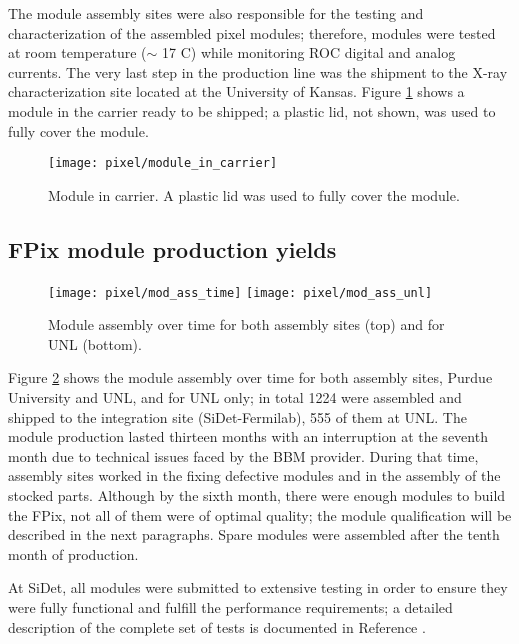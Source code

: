 The module assembly sites were also responsible for the testing and characterization of the assembled pixel modules; therefore, modules were tested at room temperature ($\sim$ 17 C) while monitoring ROC digital and analog currents. The very last step in the production line was the shipment to the X-ray characterization site located at the University of Kansas. Figure \ref{fig:module_in_carrier} shows a module in the carrier ready to be shipped; a plastic lid, not shown, was used to fully cover the module.       

\begin{figure}[h]
\centering
  \texttt{[image: pixel/module\_in\_carrier]}
 \caption[Module in carrier.]{Module in carrier. A plastic lid was used to fully cover the module.}\label{fig:module_in_carrier}
\end{figure}

\subsection{FPix module production yields}

\begin{figure}[ht]
\centering
  \texttt{[image: pixel/mod\_ass\_time]}
  \texttt{[image: pixel/mod\_ass\_unl]}
 \caption[Module assembly over time.]{Module assembly over time for both assembly sites (top) and for UNL (bottom).}\label{fig:mod_ass_time}
\end{figure}

Figure \ref{fig:mod_ass_time} shows the module assembly over time for both assembly sites, Purdue University and UNL, and for UNL only; in total 1224 were assembled and shipped to the integration site (SiDet-Fermilab), 555 of them at UNL. The module production lasted thirteen months with an interruption at the seventh month due to technical issues faced by the BBM provider. During that time, assembly sites worked in the fixing defective modules and in the assembly of the stocked parts. Although by the sixth month, there were enough modules to build the FPix, not all of them were of optimal quality; the module qualification will be described in the next paragraphs. Spare modules were assembled after the tenth month of production.     

At SiDet, all modules were submitted to extensive testing in order to ensure they were fully functional and fulfill the performance requirements; a detailed description of the complete set of tests is documented in Reference \cite{fpix_module_testing_guide}.

